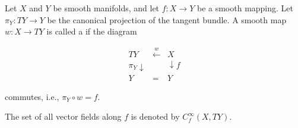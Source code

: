 Let $X$ and $Y$ be smooth manifolds, and let $f: X \to Y$ be a smooth mapping. Let $\pi_Y: TY \to Y$ be the canonical projection of the tangent bundle. A smooth map $w: X \to TY$ is called a  if the diagram

$$
\begin{array}{ccc}
TY & \xleftarrow{w} & X \\
{\scriptstyle \pi_Y}\downarrow & & \downarrow{\scriptstyle f} \\
Y & = & Y
\end{array}
$$

commutes, i.e., $\pi_Y \circ w = f$.

The set of all vector fields along $f$ is denoted by $C_f^\infty(X, TY)$.
